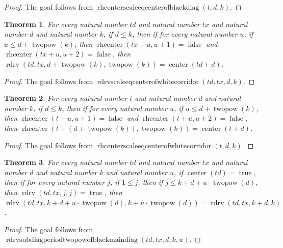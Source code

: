 \documentclass[11pt]{article}
\newtheorem{theorem}{Theorem}[section]
\theoremstyle{definition}
\begin{document}
\begin{proof}
The goal follows from \(\operatorname{rhcenterscaleeqcenterofblackdiag}(t, d, k)\).
\end{proof}
\begin{theorem}
\label{ll:paper:rdrv-scale-eq-center-of-white-corridor}
For every natural number \(td\) and natural number \(tx\) and natural number \(d\) and natural number \(k\), if \(d \le k\), then if for every natural number \(u\), if \(u \le d + \operatorname{twopow}(k)\), then \(\operatorname{rhcenter}(tx + u, u + 1) = \operatorname{false}\) and \(\operatorname{rhcenter}(tx + u, u + 2) = \operatorname{false}\), then \(\operatorname{rdrv}(td, tx, d + \operatorname{twopow}(k), \operatorname{twopow}(k)) = \operatorname{center}(td + d)\).
\end{theorem}
\begin{proof}
The goal follows from \(\operatorname{rdrvscaleeqcenterofwhitecorridor}(td, tx, d, k)\).
\end{proof}
\begin{theorem}
\label{ll:paper:rhcenter-scale-eq-center-of-white-corridor}
For every natural number \(t\) and natural number \(d\) and natural number \(k\), if \(d \le k\), then if for every natural number \(u\), if \(u \le d + \operatorname{twopow}(k)\), then \(\operatorname{rhcenter}(t + u, u + 1) = \operatorname{false}\) and \(\operatorname{rhcenter}(t + u, u + 2) = \operatorname{false}\), then \(\operatorname{rhcenter}(t + (d + \operatorname{twopow}(k)), \operatorname{twopow}(k)) = \operatorname{center}(t + d)\).
\end{theorem}
\begin{proof}
The goal follows from \(\operatorname{rhcenterscaleeqcenterofwhitecorridor}(t, d, k)\).
\end{proof}
\begin{theorem}
\label{ll:paper:rdrv-subdiag-period-twopow-of-black-main-diag}
For every natural number \(td\) and natural number \(tx\) and natural number \(d\) and natural number \(k\) and natural number \(u\), if \(\operatorname{center}(td) = \operatorname{true}\), then if for every natural number \(j\), if \(1 \le j\), then if \(j \le k + d + u \cdot \operatorname{twopow}(d)\), then \(\operatorname{rdrv}(td, tx, j, j) = \operatorname{true}\), then \(\operatorname{rdrv}(td, tx, k + d + u \cdot \operatorname{twopow}(d), k + u \cdot \operatorname{twopow}(d)) = \operatorname{rdrv}(td, tx, k + d, k)\).
\end{theorem}
\begin{proof}
The goal follows from \(\operatorname{rdrvsubdiagperiodtwopowofblackmaindiag}(td, tx, d, k, u)\).
\end{proof}
\end{document}
